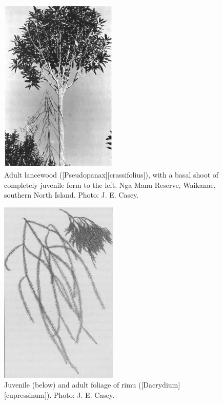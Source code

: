 \begin{figure}
	\includegraphics[width=0.5\textwidth]{graphics/figure20lancewood.jpg}
	\centering
	\caption[Adult lancewood]{Adult lancewood ([Pseudopanax][crassifolius]), with a basal shoot of completely juvenile form to the left.
Nga Manu Reserve, Waikanae, southern North Island.
	Photo: J. E. Casey.}%
	\label{fig:20lancewood}
\end{figure}

\begin{figure}
	\includegraphics[width=0.5\textwidth]{graphics/figure21rimu.jpg}
	\centering
	\caption[Rimu foliage]{Juvenile (below) and adult foliage of rimu ([Dacrydium][cupressinum]).
	Photo: J. E. Casey.}%
	\label{fig:21rimu}
\end{figure}

